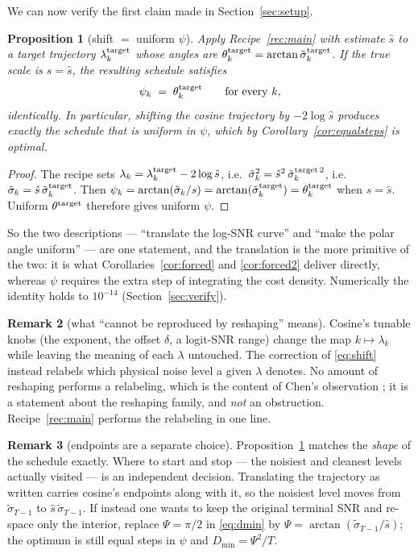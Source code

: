 \documentclass[11pt]{article}
\newtheorem{proposition}{Proposition}
\theoremstyle{definition}
\newtheorem{remark}[proposition]{Remark}
\newcommand{\sig}{\tilde\sigma}
\begin{document}
We can now verify the first claim made in Section~\ref{sec:setup}.

\begin{proposition}[shift $=$ uniform $\psi$]
\label{prop:equiv}
Apply Recipe~\ref{rec:main} with estimate $\hat s$ to a target trajectory
$\lambda^{\rm target}_k$ whose angles are $\theta^{\rm target}_k
=\arctan\sig^{\rm target}_k$. If the true scale is $s=\hat s$, the resulting
schedule satisfies
\begin{equation}
  \psi_k \;=\; \theta^{\rm target}_k \qquad\text{for every }k,
\end{equation}
identically. In particular, shifting the cosine trajectory by $-2\log\hat s$
produces exactly the schedule that is uniform in $\psi$, which by
Corollary~\ref{cor:equalsteps} is optimal.
\end{proposition}

\begin{proof}
The recipe sets $\lambda_k=\lambda^{\rm target}_k-2\log\hat s$, i.e.\
$\sig_k^2=\hat s^2\,\sig^{{\rm target}\,2}_k$, i.e.\ $\sig_k=\hat s\,\sig^{\rm
target}_k$. Then
$\psi_k=\arctan(\sig_k/s)=\arctan(\sig^{\rm target}_k)=\theta^{\rm target}_k$
when $s=\hat s$. Uniform $\theta^{\rm target}$ therefore gives uniform $\psi$.
\end{proof}

So the two descriptions --- ``translate the log-SNR curve'' and ``make the polar
angle uniform'' --- are one statement, and the translation is the more primitive
of the two: it is what Corollaries~\ref{cor:forced} and \ref{cor:forced2} deliver
directly, whereas $\psi$ requires the extra step of integrating the cost
density. Numerically the identity holds to $10^{-14}$
(Section~\ref{sec:verify}).

\begin{remark}[what ``cannot be reproduced by reshaping'' means]
\label{rem:reshape}
Cosine's tunable knobs (the exponent, the offset $\delta$, a logit-SNR range)
change the map $k\mapsto\lambda_k$ while leaving the meaning of each $\lambda$
untouched. The correction of \eqref{eq:shift} instead relabels which physical
noise level a given $\lambda$ denotes. No amount of reshaping performs a
relabeling, which is the content of Chen's observation
\cite{chen2023importance}; it is a statement about the reshaping family, and
\emph{not} an obstruction. Recipe~\ref{rec:main} performs the relabeling in one
line.
\end{remark}

\begin{remark}[endpoints are a separate choice]
Proposition~\ref{prop:equiv} matches the \emph{shape} of the schedule exactly.
Where to start and stop --- the noisiest and cleanest levels actually visited ---
is an independent decision. Translating the trajectory as written carries
cosine's endpoints along with it, so the noisiest level moves from
$\sig_{T-1}$ to $\hat s\,\sig_{T-1}$. If instead one wants to keep the original
terminal SNR and re-space only the interior, replace $\Psi=\pi/2$ in
\eqref{eq:dmin} by $\Psi=\arctan(\sig_{T-1}/\hat s)$; the optimum is still equal
steps in $\psi$ and $D_{\min}=\Psi^2/T$.
\end{remark}
\end{document}
